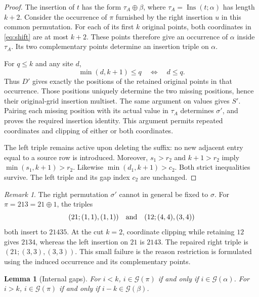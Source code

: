 \documentclass[11pt,a4paper]{article}
\newtheorem{lemma}[theorem]{Lemma}
\theoremstyle{remark}
\newtheorem{remark}[theorem]{Remark}
\newcommand{\Ins}{\operatorname{Ins}}
\newcommand{\good}{\mathcal{G}}\newcommand{\skewsum}{\mathbin{\mathrm{skew}}}
\begin{document}
\begin{proof}
The insertion of $t$ has the form $\tau_A\oplus\beta$, where
$\tau_A=\Ins(t;\alpha)$ has length $k+2$. Consider the occurrence of
$\pi$ furnished by the right insertion $u$ in this common permutation.
For each of its first $k$ original points, both coordinates in
\eqref{eq:shift} are at most $k+2$. These points therefore give an
occurrence of $\alpha$ inside $\tau_A$. Its two complementary points
determine an insertion triple on $\alpha$.

For $q\le k$ and any site $d$,
\[
 \min(d,k+1)\le q\quad\Longleftrightarrow\quad d\le q.
\]
Thus $D'$ gives exactly the positions of the retained original points
in that occurrence. Those positions uniquely determine the two missing
positions, hence their original-grid insertion multiset. The same
argument on values gives $S'$. Pairing each missing position with its
actual value in $\tau_A$ determines $\sigma'$, and proves the required
insertion identity. This argument permits repeated coordinates and
clipping of either or both coordinates.

The left triple remains active upon deleting the suffix: no new
adjacent entry equal to a source row is introduced. Moreover,
$s_1>r_2$ and $k+1>r_2$ imply $\min(s_1,k+1)>r_2$.
Likewise $\min(d_1,k+1)>c_2$. Both strict inequalities survive.
The left triple and its gap index $c_2$ are unchanged.
\end{proof}

\begin{remark}\label{rem:clipping}
The right permutation $\sigma'$ cannot in general be fixed to $\sigma$.
For $\pi=213=21\oplus1$, the triples
\[
 (21;(1,1),(1,1))\quad\hbox{and}\quad(12;(4,4),(3,4))
\]
both insert to $21435$. At the cut $k=2$, coordinate clipping while
retaining $12$ gives $2134$, whereas the left insertion on $21$ is
$2143$. The repaired right triple is $(21;(3,3),(3,3))$.
This small failure is the reason restriction is formulated using the
induced occurrence and its complementary points.
\end{remark}

\begin{lemma}[Internal gaps]\label{lem:internal}
For $i<k$, $i\in\good(\pi)$ if and only if $i\in\good(\alpha)$.
For $i>k$, $i\in\good(\pi)$ if and only if $i-k\in\good(\beta)$.
\end{lemma}
\end{document}
